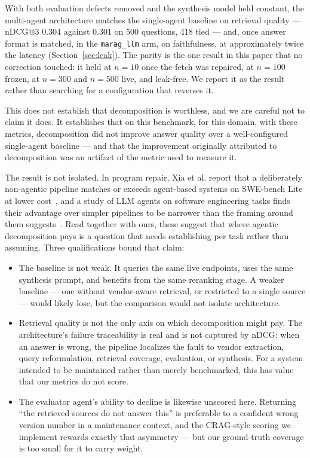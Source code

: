 \documentclass[acmsmall,review,anonymous,screen]{acmart}
\begin{document}
With both evaluation defects removed and the synthesis model held constant,
the multi-agent architecture matches the single-agent baseline on retrieval
quality --- nDCG@3 0.304 against 0.301 on 500 questions, 418 tied --- and, once
answer format is matched, in the \texttt{marag\_llm} arm, on faithfulness, at
approximately twice the latency (Section~\ref{sec:leak}). The parity is the one
result in this paper that no correction touched: it held at $n=10$ once the
fetch was repaired, at $n=100$ frozen, at $n=300$ and $n=500$ live, and
leak-free. We report it as the result rather than searching for a configuration
that reverses it.

This does not establish that decomposition is worthless, and we are careful not
to claim it does. It establishes that on this benchmark, for this domain, with
these metrics, decomposition did not improve answer quality over a
well-configured single-agent baseline --- and that the improvement originally
attributed to decomposition was an artifact of the metric used to measure it.

The result is not isolated. In program repair, Xia et al. report that a
deliberately non-agentic pipeline matches or exceeds agent-based systems on
SWE-bench Lite at lower cost~\cite{xia2025agentless}, and a study of LLM agents on
software engineering tasks finds their advantage over simpler pipelines to be
narrower than the framing around them
suggests~\cite{wang2024rocks}. Read together with ours, these
suggest that where agentic decomposition pays is a question that needs
establishing per task rather than assuming.
Three qualifications bound that claim:

\begin{itemize}
  \item The baseline is not weak. It queries the same live endpoints, uses the
  same synthesis prompt, and benefits from the same reranking stage. A weaker
  baseline --- one without vendor-aware retrieval, or restricted to a single
  source --- would likely lose, but the comparison would not isolate
  architecture.

  \item Retrieval quality is not the only axis on which decomposition might pay.
  The architecture's failure traceability is real and is not captured by nDCG:
  when an answer is wrong, the pipeline localizes the fault to vendor
  extraction, query reformulation, retrieval coverage, evaluation, or synthesis.
  For a system intended to be maintained rather than merely benchmarked, this
  has value that our metrics do not score.

  \item The evaluator agent's ability to decline is likewise unscored here.
  Returning ``the retrieved sources do not answer this'' is preferable to a
  confident wrong version number in a maintenance context, and the CRAG-style
  scoring we implement rewards exactly that asymmetry --- but our ground-truth
  coverage is too small for it to carry weight.
\end{itemize}
\end{document}
